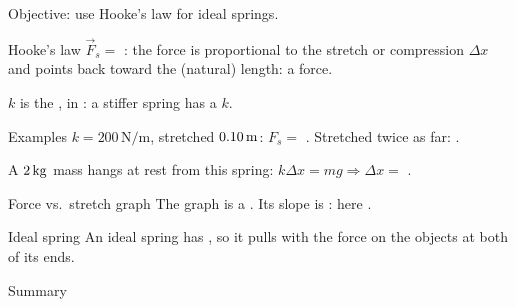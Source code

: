 \begin{center}\textsf{\small\color{apgrey}Objective: use Hooke's law for ideal springs.}\end{center}
\begin{nrow}{Hooke's law}
$\vec F_s=$ : the force is proportional to the stretch or compression $\Delta x$ and points back toward the  (natural) length: a  force.\par
$k$ is the , in : a stiffer spring has a  $k$.
\end{nrow}
\begin{nrow}{Examples}
$k=200\,\mathrm{N/m}$, stretched $0.10\,\mathrm{m}$: $F_s=$ \fillin{$20\N$}. \quad Stretched twice as far: \fillin{$40\N$}.\par
A $2\,\mathrm{kg}$ mass hangs at rest from this spring: $k\Delta x=mg\Rightarrow\Delta x=$ .
\end{nrow}
\begin{nrow}{Force vs.\ stretch graph}
The graph is a . Its slope is : here .
\end{nrow}
\begin{nrow}{Ideal spring}
An ideal spring has , so it pulls with the  force on the objects at both of its ends.
\end{nrow}
\begin{nrow}{Summary}
\else\vspace{2.2cm}\fi
\end{nrow}

